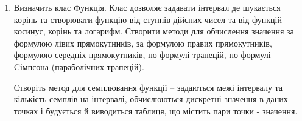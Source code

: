 \documentclass[]{article}
\begin{document}
\begin{enumerate}
\item
Визначить клас Функція. Клас дозволяє задавати інтервал де шукається корінь та створювати функцію
від ступнів дійсних чисел та від функцій косинус, корінь та логарифм.
Створити методи для обчислення значення за формулою лівих прямокутників,
за формулою правих прямокутників, формулою середніх прямокутників,
по формулі трапецій, по формулі Cімпсона (параболічних трапецій).

Створіть метод для семплювання функції -- задаються межі інтервалу та кількість
семплів на інтервалі, обчислюються дискретні значення в даних точках і будується
 й виводиться таблиця, що містить пари точки - значення.


\end{enumerate}
\end{document}
